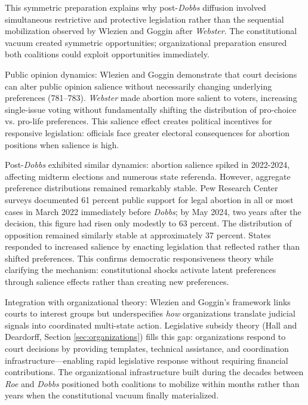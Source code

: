 This symmetric preparation explains why post-\textit{Dobbs} diffusion involved simultaneous restrictive and protective legislation rather than the sequential mobilization observed by Wlezien and Goggin after \textit{Webster}. The constitutional vacuum created symmetric opportunities; organizational preparation ensured both coalitions could exploit opportunities immediately.

Public opinion dynamics: Wlezien and Goggin demonstrate that court decisions can alter public opinion salience without necessarily changing underlying preferences (781--783). \textit{Webster} made abortion more salient to voters, increasing single-issue voting without fundamentally shifting the distribution of pro-choice vs. pro-life preferences. This salience effect creates political incentives for responsive legislation: officials face greater electoral consequences for abortion positions when salience is high.

Post-\textit{Dobbs} exhibited similar dynamics: abortion salience spiked in 2022-2024, affecting midterm elections and numerous state referenda. However, aggregate preference distributions remained remarkably stable. Pew Research Center surveys documented 61 percent public support for legal abortion in all or most cases in March 2022 \parencite{dohertyBroadPublicSupport2024} immediately before \textit{Dobbs}; by May 2024, two years after the decision, this figure had risen only modestly to 63 percent. The distribution of opposition remained similarly stable at approximately 37 percent. States responded to increased salience by enacting legislation that reflected rather than shifted preferences. This confirms democratic responsiveness theory while clarifying the mechanism: constitutional shocks activate latent preferences through salience effects rather than creating new preferences.

Integration with organizational theory: Wlezien and Goggin's framework links courts to interest groups but underspecifies \textit{how} organizations translate judicial signals into coordinated multi-state action. Legislative subsidy theory (Hall and Deardorff, Section \ref{sec:organizations}) fills this gap: organizations respond to court decisions by providing templates, technical assistance, and coordination infrastructure---enabling rapid legislative response without requiring financial contributions. The organizational infrastructure built during the decades between \textit{Roe} and \textit{Dobbs} positioned both coalitions to mobilize within months rather than years when the constitutional vacuum finally materialized.


